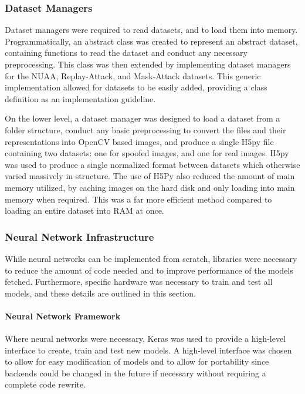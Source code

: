 \documentclass[12pt,a4paper]{article}
\begin{document}
        \subsubsection{Dataset Managers}
        Dataset managers were required to read datasets, and to load them into memory. Programmatically, an abstract class was created to represent an abstract dataset, containing functions to read the dataset and conduct any necessary preprocessing. This class was then extended by implementing dataset managers for the NUAA, Replay-Attack, and Mask-Attack datasets. This generic implementation allowed for datasets to be easily added, providing a class definition as an implementation guideline. 

        On the lower level, a dataset manager was designed to load a dataset from a folder structure, conduct any basic preprocessing to convert the files and their representations into OpenCV based images, and produce a single H5py file containing two datasets: one for spoofed images, and one for real images. H5py was used to produce a single normalized format between datasets which otherwise varied massively in structure. The use of H5Py also reduced the amount of main memory utilized, by caching images on the hard disk and only loading into main memory when required. This was a far more efficient method compared to loading an entire dataset into RAM at once.

        \subsubsection{Neural Network Infrastructure}
            While neural networks can be implemented from scratch, libraries were necessary to reduce the amount of code needed and to improve performance of the models fetched.
            Furthermore, specific hardware was necessary to train and test all models, and these details are outlined in this section.

            \paragraph{Neural Network Framework} 
            Where neural networks were necessary, Keras was used to provide a high-level interface to create, train and test new models. A high-level interface was chosen to allow for easy modification of models and to allow for portability since backends could be changed in the future if necessary without requiring a complete code rewrite.
\end{document}
